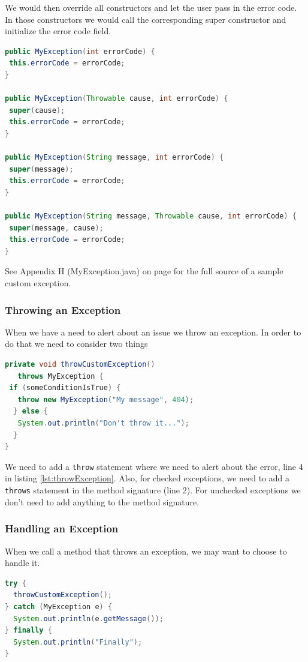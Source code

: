 We would then override all constructors and let the user pass in the error code. In those constructors we would call the corresponding super constructor and  initialize the error code field. 
\begin{lstlisting}[language=Java]
public MyException(int errorCode) {
 this.errorCode = errorCode;
}

public MyException(Throwable cause, int errorCode) {
 super(cause);
 this.errorCode = errorCode;
}

public MyException(String message, int errorCode) {
 super(message);
 this.errorCode = errorCode;
}

public MyException(String message, Throwable cause, int errorCode) {
 super(message, cause);
 this.errorCode = errorCode;
}
\end{lstlisting}


See Appendix H (MyException.java) on page \pageref{App:AppendixHExeption} for the full source of a sample custom exception.


\subsubsection{Throwing an Exception}
When we have a need to alert about an issue we throw an exception. In order to do that we need to consider two things
\begin{lstlisting}[language=Java, label=lst:throwException]
private void throwCustomException() 
   throws MyException {
 if (someConditionIsTrue) {
   throw new MyException("My message", 404);
  } else {
   System.out.println("Don't throw it...");
  }
}
\end{lstlisting}

We need to add a \texttt{throw} statement where we need to alert about the error, line 4 in listing \ref{lst:throwException}. Also, for checked exceptions, we need to add a \texttt{throws} statement in the method signature (line 2). For unchecked exceptions we don't need to add anything to the method signature.

\subsubsection{Handling an Exception}
When we call a method that throws an exception, we may want to choose to handle it. 

\begin{lstlisting}[language=Java, label=lst:catch]
try {
  throwCustomException();
} catch (MyException e) {
  System.out.println(e.getMessage());
} finally {
  System.out.println("Finally");
}
\end{lstlisting}

